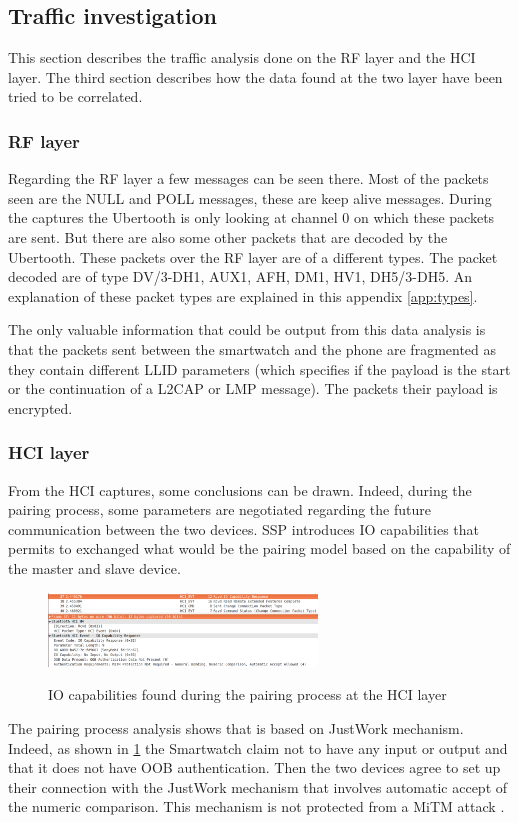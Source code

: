 \subsection{Traffic investigation}
This section describes the traffic analysis done on the RF layer and the HCI layer. The third section describes how the data found at the two layer have been tried to be correlated.
\subsubsection{RF layer}
\label{subsubsection:rflayer}
Regarding the RF layer a few messages can be seen there. Most of the packets seen are the NULL and POLL messages, these are keep alive messages. During the captures the Ubertooth is only looking at channel 0 on which these packets are sent.
But there are also some other packets that are decoded by the Ubertooth. These packets over the RF layer are of a different types. The packet decoded are of type DV/3-DH1, AUX1, AFH, DM1, HV1, DH5/3-DH5. An explanation of these packet types are explained in this appendix \ref{app:types}.

The only valuable information that could be output from this data analysis is that the packets sent between the smartwatch and the phone are fragmented as they contain different LLID parameters (which specifies if the payload is the start or the continuation of a L2CAP or LMP message). The packets their payload is encrypted.

\subsubsection{HCI layer}
From the HCI captures, some conclusions can be drawn. Indeed, during the pairing process, some parameters are negotiated regarding the future communication between the two devices. SSP introduces IO capabilities that permits to exchanged what would be the pairing model based on the capability of the master and slave device. 
\begin{figure}[!h]
  \begin{center}
	\includegraphics[width=270px]{images/IO_PARAM.png}
	\label{fig:io}
	\caption{IO capabilities found during the pairing process at the HCI layer}
  \end{center}
\end{figure}
The pairing process analysis shows that is based on JustWork mechanism. Indeed, as shown in \ref{fig:io} the Smartwatch claim not to have any input or output and that it does not have OOB authentication. Then the two devices agree to set up their connection with the JustWork mechanism that involves automatic accept of the numeric comparison. This mechanism is not protected from a MiTM attack \cite{MiTMjustworks}.

